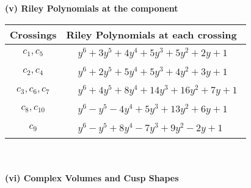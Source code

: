 \documentclass[1p]{elsarticle_modified}
\theoremstyle{definition}
\begin{document}
\newpage\renewcommand{\arraystretch}{1}
\flushleft \textbf{(v) Riley Polynomials at the component}\newline \\
\begin{tabular}{m{50pt}|m{274pt}}
Crossings & \hspace{64pt}Riley Polynomials at each crossing \\
\hline $$\begin{aligned}c_{1},c_{5}\end{aligned}$$&$\begin{aligned}
&y^6+3 y^5+4 y^4+5 y^3+5 y^2+2 y+1
\end{aligned}$\\
\hline $$\begin{aligned}c_{2},c_{4}\end{aligned}$$&$\begin{aligned}
&y^6+2 y^5+5 y^4+5 y^3+4 y^2+3 y+1
\end{aligned}$\\
\hline $$\begin{aligned}c_{3},c_{6},c_{7}\end{aligned}$$&$\begin{aligned}
&y^6+4 y^5+8 y^4+14 y^3+16 y^2+7 y+1
\end{aligned}$\\
\hline $$\begin{aligned}c_{8},c_{10}\end{aligned}$$&$\begin{aligned}
&y^6- y^5-4 y^4+5 y^3+13 y^2+6 y+1
\end{aligned}$\\
\hline $$\begin{aligned}c_{9}\end{aligned}$$&$\begin{aligned}
&y^6- y^5+8 y^4-7 y^3+9 y^2-2 y+1
\end{aligned}$\\
\hline
\end{tabular}\\~\\
\newpage\flushleft \textbf{(vi) Complex Volumes and Cusp Shapes}
\end{document}
